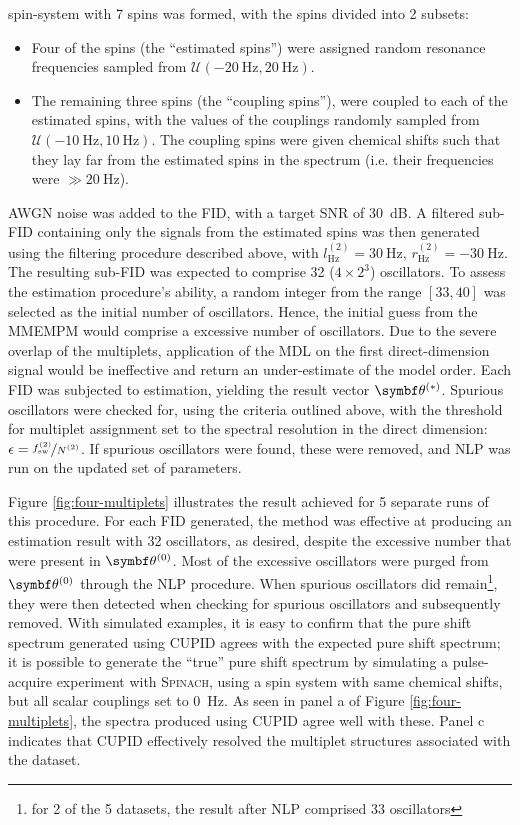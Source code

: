 spin-system with 7 spins was formed, with the spins divided into 2 subsets:
\begin{itemize}
    \item Four of the spins (the ``estimated spins'') were assigned random
        resonance frequencies sampled from $\mathcal{U}(\qty{-20}{\hertz},
        \qty{20}{\hertz})$.
    \item The remaining three spins (the ``coupling spins''), were coupled to each
        of the estimated spins, with the values of the couplings randomly
        sampled from $\mathcal{U}(\qty{-10}{\hertz}, \qty{10}{\hertz})$.  The
        coupling spins were given chemical shifts such that they lay far from
        the estimated spins in the spectrum (i.e. their frequencies were $\gg
        \qty{20}{\hertz}$).
\end{itemize}
\ac{AWGN} noise was added to the \ac{FID}, with a target \ac{SNR} of \qty{30}{\deci\bel}.
A filtered sub-\ac{FID} containing only the signals from the estimated spins
was then generated using the filtering procedure described above, with
$l^{(2)}_{\unit{\hertz}} = \qty{30}{\hertz}$,
$r^{(2)}_{\unit{\hertz}} = \qty{-30}{\hertz}$.
The resulting sub-\ac{FID} was expected to comprise 32 ($4 \times
2^3$) oscillators. To assess the estimation procedure's ability, a random
integer from the range $[33, 40]$ was selected as the initial number of
oscillators. Hence, the initial guess from the \ac{MMEMPM} would comprise a
excessive number of oscillators. Due to the severe overlap of the multiplets,
application of the \ac{MDL} on the first direct-dimension signal would be
ineffective and return an under-estimate of the model order. Each \ac{FID} was
subjected to estimation, yielding the result vector $\bthstar$. Spurious
oscillators were checked for, using the criteria outlined above, with the
threshold for multiplet assignment set to the spectral resolution in the direct
dimension: $\epsilon = \nicefrac{f_{\text{sw}}^{(2)}}{N^{(2)}}$. If spurious
oscillators were found, these were removed, and \ac{NLP} was run on the updated
set of parameters.

Figure \ref{fig:four-multiplets} illustrates the result achieved for 5 separate
runs of this procedure.
For each \ac{FID} generated, the method was effective at producing an
estimation result with 32 oscillators, as desired, despite the excessive number
that were present in $\bthzero$. Most of the excessive oscillators were purged
from $\bthzero$ through the \ac{NLP} procedure. When spurious oscillators did
remain\footnote{for 2 of the 5 datasets, the result after \ac{NLP} comprised 33
oscillators}, they were then detected when checking for spurious oscillators
and subsequently removed. With simulated examples, it is easy to confirm that
the pure shift spectrum generated using \ac{CUPID} agrees with the expected
pure shift spectrum; it is possible to generate the ``true'' pure shift
spectrum by simulating a pulse-acquire experiment with \textsc{Spinach}, using
a spin system with same chemical shifts, but all scalar couplings set to
\qty{0}{\hertz}.
As seen in panel a of Figure \ref{fig:four-multiplets}, the spectra produced
using \ac{CUPID} agree well with these. Panel c indicates that \ac{CUPID}
effectively resolved the multiplet structures associated with the dataset.

